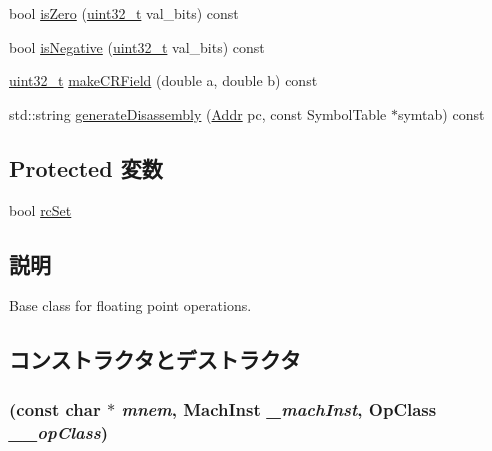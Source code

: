 \begin{DoxyCompactItemize}
bool \hyperlink{classPowerISA_1_1FloatOp_afd82689855b7421dec097b83f2d889c3}{isZero} (\hyperlink{Type_8hh_a435d1572bf3f880d55459d9805097f62}{uint32\_\-t} val\_\-bits) const 
\item 
bool \hyperlink{classPowerISA_1_1FloatOp_a1dd26f04e8ccb5902f4c888c84c630c6}{isNegative} (\hyperlink{Type_8hh_a435d1572bf3f880d55459d9805097f62}{uint32\_\-t} val\_\-bits) const 
\item 
\hyperlink{Type_8hh_a435d1572bf3f880d55459d9805097f62}{uint32\_\-t} \hyperlink{classPowerISA_1_1FloatOp_ad27ebce7088c3abe70cd7fae2ffd2008}{makeCRField} (double a, double b) const 
\item 
std::string \hyperlink{classPowerISA_1_1FloatOp_a95d323a22a5f07e14d6b4c9385a91896}{generateDisassembly} (\hyperlink{base_2types_8hh_af1bb03d6a4ee096394a6749f0a169232}{Addr} pc, const SymbolTable $\ast$symtab) const 
\end{DoxyCompactItemize}
\subsection*{Protected 変数}
\begin{DoxyCompactItemize}
\item 
bool \hyperlink{classPowerISA_1_1FloatOp_abfffe0b446d6f9419bdf9e72c73741fc}{rcSet}
\end{DoxyCompactItemize}


\subsection{説明}
Base class for floating point operations. 

\subsection{コンストラクタとデストラクタ}
\hypertarget{classPowerISA_1_1FloatOp_ab0692bece3bc7d9c6e04bc5526be8eef}{
\subsubsection[{FloatOp}]{ (const char $\ast$ {\em mnem}, \/  {\bf MachInst} {\em \_\-machInst}, \/  OpClass {\em \_\-\_\-opClass})}}
\label{classPowerISA_1_1FloatOp_ab0692bece3bc7d9c6e04bc5526be8eef}


